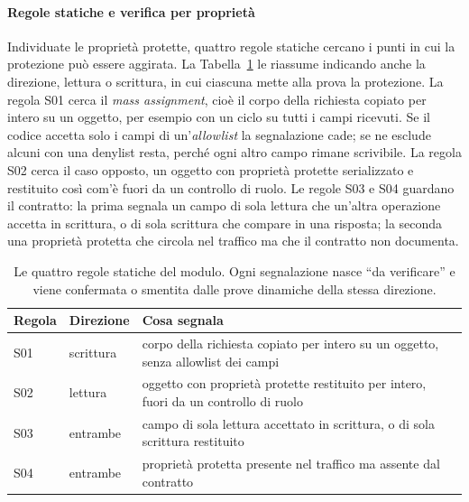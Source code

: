 \paragraph{Regole statiche e verifica per proprietà}
Individuate le proprietà protette, quattro regole statiche cercano i punti in
cui la protezione può essere aggirata. La Tabella~\ref{tab:regole-bopla} le
riassume indicando anche la direzione, lettura o scrittura, in cui ciascuna
mette alla prova la protezione. La
regola S01 cerca il \emph{mass assignment}, cioè il corpo
della richiesta copiato per intero su un oggetto, per esempio con un ciclo su
tutti i campi ricevuti. Se il codice accetta solo i campi di
un'\emph{allowlist} la segnalazione cade; se ne esclude
alcuni con una denylist resta, perché ogni altro campo rimane scrivibile. La
regola S02 cerca il caso opposto, un oggetto con proprietà protette serializzato
e restituito così com'è fuori da un controllo di ruolo. Le regole S03 e S04
guardano il contratto: la prima segnala un campo di sola lettura che un'altra
operazione accetta in scrittura, o di sola scrittura che compare in una
risposta; la seconda una proprietà protetta che circola nel traffico ma che il
contratto non documenta.

\begin{table}[htbp]
  \centering
  \small
  \linespread{1.0}\selectfont
  \begin{tabularx}{\linewidth}{@{}l l X@{}}
    \toprule
    \textbf{Regola} & \textbf{Direzione} & \textbf{Cosa segnala} \\
    \midrule
    S01 & scrittura & corpo della richiesta copiato per intero su un oggetto,
    senza allowlist dei campi \\
    S02 & lettura & oggetto con proprietà protette restituito per intero, fuori da
    un controllo di ruolo \\
    S03 & entrambe & campo di sola lettura accettato in scrittura, o di sola
    scrittura restituito \\
    S04 & entrambe & proprietà protetta presente nel traffico ma assente dal
    contratto \\
    \bottomrule
  \end{tabularx}
  \caption[Regole statiche della BOPLA]{Le quattro regole statiche del modulo.
    Ogni segnalazione nasce ``da verificare'' e viene confermata o smentita dalle
  prove dinamiche della stessa direzione.}
  \label{tab:regole-bopla}
\end{table}


